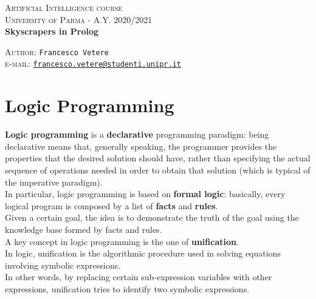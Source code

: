 \documentclass{article}
\date{}
\begin{document}
\begin{titlepage}
  \begin{center}
     \Large\textsc{Artificial Intelligence course\\University of Parma - A.Y. 2020/2021}\\
     \vspace{1cm}
     \Large\textbf{Skyscrapers in Prolog}\\
     \vspace{1cm}
     
      \large{\textsc{Author}: \texttt{Francesco Vetere}\\ \small \textsc{e-mail:} \href{mailto:francesco.vetere@studenti.unipr.it}{\texttt{francesco.vetere@studenti.unipr.it}} }
  \end{center}
\end{titlepage}

\pagebreak

\tableofcontents

\pagebreak

\section{Logic Programming}
\textbf{Logic programming} is a \textbf{declarative} programming paradigm: being declarative means that, generally speaking, the programmer provides the properties that the desired solution should have, rather than specifying the actual sequence of operations needed in order to obtain that solution (which is typical of the imperative paradigm).\\

In particular, logic programming is based on \textbf{formal logic}: basically, every logical program is composed by a list of \textbf{facts} and \textbf{rules}.\\
Given a certain goal, the idea is to demonstrate the truth of the goal using the knowledge base formed by facts and rules.\\

A key concept in logic programming is the one of \textbf{unification}.\\

In logic, unification is the algorithmic procedure used in solving equations involving symbolic expressions.\\
In other words, by replacing certain sub-expression variables with other expressions, unification tries to identify two symbolic expressions.\\
\end{document}
